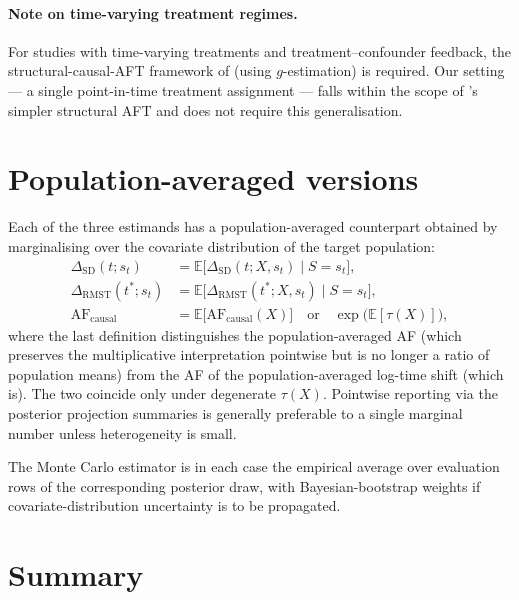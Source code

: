 \documentclass[11pt]{article}
\theoremstyle{plain}
\theoremstyle{definition}
\theoremstyle{remark}
\newcommand{\1}{\mathds{1}}
\newcommand{\X}{X}
\newcommand{\Sx}{S}
\newcommand{\tauf}{\tau}
\newcommand{\RMST}{\mathrm{RMST}}
\newcommand{\SD}{\mathrm{SD}}
\newcommand{\AF}{\mathrm{AF}}
\begin{document}
\paragraph{Note on time-varying treatment regimes.}
For studies with time-varying treatments and treatment--confounder
feedback, the structural-causal-AFT framework of
\citet{HernanColeStrAFT2005} (using $g$-estimation) is required. Our
setting --- a single point-in-time treatment assignment --- falls within
the scope of \citet{Brathovde2024}'s simpler structural AFT and does not
require this generalisation.

\section{Population-averaged versions}

Each of the three estimands has a population-averaged counterpart obtained
by marginalising over the covariate distribution of the target population:
\begin{align}
  \Delta_{\SD}(t; s_{t})
  &= \mathbb{E}\bigl[\Delta_{\SD}(t; \X, s_{t}) \mid \Sx = s_{t}\bigr], \\
  \Delta_{\RMST}(t^{*}; s_{t})
  &= \mathbb{E}\bigl[\Delta_{\RMST}(t^{*}; \X, s_{t}) \mid \Sx = s_{t}\bigr], \\
  \AF_{\mathrm{causal}}
  &= \mathbb{E}\bigl[\AF_{\mathrm{causal}}(\X)\bigr]
   \quad \text{or} \quad
   \exp\bigl(\mathbb{E}[\tauf(\X)]\bigr),
\end{align}
where the last definition distinguishes the population-averaged AF (which
preserves the multiplicative interpretation pointwise but is no longer a
ratio of population means) from the AF of the population-averaged log-time
shift (which is). The two coincide only under degenerate $\tauf(\X)$.
Pointwise reporting via the posterior projection summaries is generally
preferable to a single marginal number unless heterogeneity is small.

The Monte Carlo estimator is in each case the empirical average over
evaluation rows of the corresponding posterior draw, with Bayesian-bootstrap
weights if covariate-distribution uncertainty is to be propagated.

\section{Summary}
\end{document}
